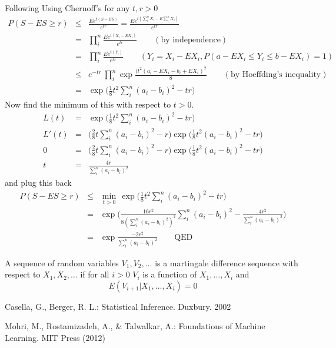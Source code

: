 \begin{prf}  Following \cite{Mohri2012}
Using Chernoff's for any $t,r > 0$
\begin{eqnarray*}
P(S - E S \geq r) & \leq & \frac{E e^{t (S - E S)}}{e^{tr}} = \frac{E e^{t (\sum_i^n X_i - E \sum_i^n X_i)}}{e^{tr}} \\
& = & \prod_i^n \frac{E e^{t (X_i - E X_i)}}{e^{tr}} \qquad (\text{by independence})\\
& = & \prod_i^n \frac{E e^{t (Y_i)}}{e^{tr}} \qquad (Y_i = X_i - E X_i, P(a-E X_i \leq Y_i \leq b - E X_i) = 1)\\
& \leq & e^{-tr} \, \prod_i^n \exp \frac{(t^2 (a_i - E X_i - b_i + E X_i)^2}{8} \qquad (\text{by Hoeffding's inequality}) \\
& = & \exp \Big( \frac{1}{8} t^2 \sum_i^n (a_i - b_i)^2 - tr\Big)
\end{eqnarray*}
Now find the minimum of this with respect to $t > 0$.
\begin{eqnarray*}
L(t) & = & \exp \Big( \frac{1}{8} t^2 \sum_i^n (a_i - b_i)^2 - tr\Big) \\
L'(t) & = & \Big( \frac{2}{8} t \sum_i^n (a_i-b_i)^2 - r \Big) \exp \Big( \frac{1}{8} t^2 (a_i - b_i)^2 - tr\Big) \\
0 & = & \Big( \frac{2}{8} t \sum_i^n (a_i-b_i)^2 - r \Big) \exp \Big( \frac{1}{8} t^2 (a_i - b_i)^2 - tr\Big) \\
t & = & \frac{4r}{\sum_i^n (a_i-b_i)^2} 
\end{eqnarray*}
and plug this back
\begin{eqnarray*}
P(S - E S \geq r) & \leq & \min_{t>0} \, \exp \Big( \frac{1}{8} t^2 \sum_i^n (a_i - b_i)^2 - tr\Big) \\
 & = & \exp \Big( \frac{16r^2}{8 (\sum_i^n (a_i - b_i)^2 )^2} \sum_i^n (a_i - b_i)^2 - \frac{4r^2}{\sum_i^n (a_i-b_i)^2} \Big) \\
 & = & \exp \frac{-2r^2}{\sum_i^n (a_i - b_i)^2} \qquad \text{QED}
\end{eqnarray*}
\end{prf}

\begin{definition}
A sequence of random variables $V_1, V_2, \ldots$ is a martingale difference sequence with respect to $X_1, X_2, \ldots$ if for all $i > 0$ $V_i$ is a function of $X_1,\ldots,X_i$ and
\begin{equation*}
E ( V_{i+1} | X_1,\ldots,X_i ) = 0
\end{equation*}
\end{definition}


\begin{thebibliography}{9}

Casella, G., Berger, R. L.: Statistical Inference. Duxbury. 2002

Mohri, M., Rostamizadeh, A., \& Talwalkar, A.: Foundations of Machine Learning. MIT Press (2012)

\end{thebibliography}



